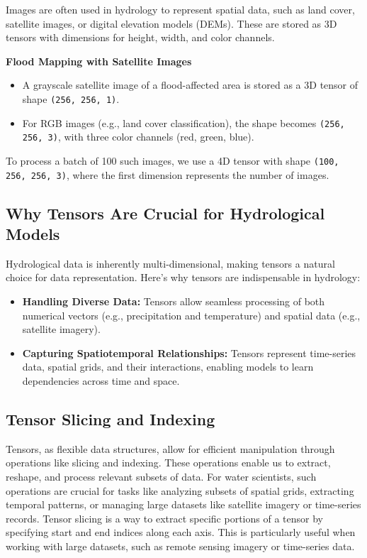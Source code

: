 \begin{tcolorbox}[enhanced,
  watermark opacity=0.3,watermark zoom=0.9,
  colback=blue!5!white, colframe=blue!70!black,
  fonttitle=\bfseries, title=Do you know? ]
Images are often used in hydrology to represent spatial data, such as land cover, satellite images, or digital elevation models (DEMs). These are stored as 3D tensors with dimensions for height, width, and color channels.

\textbf{Flood Mapping with Satellite Images}  
\begin{itemize}
    \item  A grayscale satellite image of a flood-affected area is stored as a 3D tensor of shape \texttt{(256, 256, 1)}.
    \item  For RGB images (e.g., land cover classification), the shape becomes \texttt{(256, 256, 3)}, with three color channels (red, green, blue).
\end{itemize}

To process a batch of 100 such images, we use a 4D tensor with shape \texttt{(100, 256, 256, 3)}, where the first dimension represents the number of images.
\end{tcolorbox}



\subsection{Why Tensors Are Crucial for Hydrological Models}

Hydrological data is inherently multi-dimensional, making tensors a natural choice for data representation. Here’s why tensors are indispensable in hydrology:
\begin{itemize}
    \item \textbf{Handling Diverse Data:} Tensors allow seamless processing of both numerical vectors (e.g., precipitation and temperature) and spatial data (e.g., satellite imagery).
    \item \textbf{Capturing Spatiotemporal Relationships:} Tensors represent time-series data, spatial grids, and their interactions, enabling models to learn dependencies across time and space.
\end{itemize}


\subsection{Tensor Slicing and Indexing}

Tensors, as flexible data structures, allow for efficient manipulation through operations like slicing and indexing. These operations enable us to extract, reshape, and process relevant subsets of data. For water scientists, such operations are crucial for tasks like analyzing subsets of spatial grids, extracting temporal patterns, or managing large datasets like satellite imagery or time-series records.
Tensor slicing is a way to extract specific portions of a tensor by specifying start and end indices along each axis. This is particularly useful when working with large datasets, such as remote sensing imagery or time-series data.

